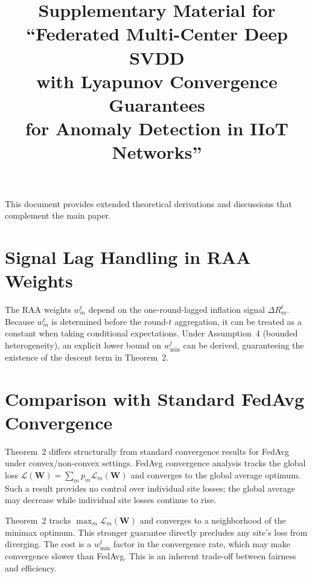 \documentclass[10pt,journal,compsoc]{IEEEtran}
\begin{document}
\title{Supplementary Material for ``Federated Multi-Center Deep SVDD\\with Lyapunov Convergence Guarantees\\for Anomaly Detection in IIoT Networks''}

\maketitle

\noindent This document provides extended theoretical derivations and discussions that complement the main paper.

\tableofcontents
\bigskip

\section{Signal Lag Handling in RAA Weights}
\label{sup:signal-lag}

The RAA weights $w_m^t$ depend on the one-round-lagged inflation signal $\Delta R_m^t$. Because $w_m^t$ is determined before the round-$t$ aggregation, it can be treated as a constant when taking conditional expectations. Under Assumption~4 (bounded heterogeneity), an explicit lower bound on $w_{\min}^t$ can be derived, guaranteeing the existence of the descent term in Theorem~2.


\section{Comparison with Standard FedAvg Convergence}
\label{sup:fedavg-comparison}

Theorem~2 differs structurally from standard convergence results for FedAvg under convex/non-convex settings. FedAvg convergence analysis tracks the global loss $\mathcal{L}(\mathbf{W}) = \sum_m p_m \mathcal{L}_m(\mathbf{W})$ and converges to the global average optimum. Such a result provides no control over individual site losses; the global average may decrease while individual site losses continue to rise.

Theorem~2 tracks $\max_m \mathcal{L}_m(\mathbf{W})$ and converges to a neighborhood of the minimax optimum. This stronger guarantee directly precludes any site's loss from diverging. The cost is a $w_{\min}^t$ factor in the convergence rate, which may make convergence slower than FedAvg. This is an inherent trade-off between fairness and efficiency.
\end{document}
